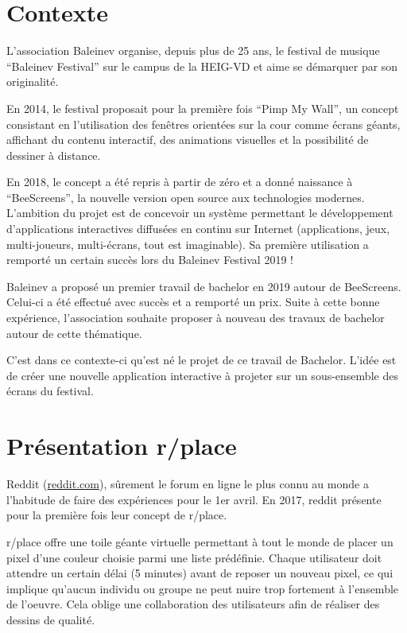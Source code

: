 \section{Contexte}
L'association Baleinev organise, depuis plus de 25 ans, le festival de musique “Baleinev Festival” sur le campus de la HEIG-VD et aime se démarquer par son originalité.

En 2014, le festival proposait pour la première fois “Pimp My Wall”, un concept consistant en l'utilisation des fenêtres orientées sur la cour comme écrans géants, affichant du contenu interactif, des animations visuelles et la possibilité de dessiner à distance.

En 2018, le concept a été repris à partir de zéro et a donné naissance à “BeeScreens”, la nouvelle version open source aux technologies modernes. L'ambition du projet est de concevoir un système permettant le développement d'applications interactives diffusées en continu sur Internet (applications, jeux, multi-joueurs, multi-écrans, tout est imaginable). Sa première utilisation a remporté un certain succès lors du Baleinev Festival 2019 !

Baleinev a proposé un premier travail de bachelor en 2019 autour de BeeScreens. Celui-ci a été effectué avec succès et a remporté un prix. Suite à cette bonne expérience, l'association souhaite proposer à nouveau des travaux de bachelor autour de cette thématique.

C'est dans ce contexte-ci qu'est né le projet de ce travail de Bachelor. L'idée est de créer une nouvelle application interactive à projeter sur un sous-ensemble des écrans du festival.

\section{Présentation r/place}
Reddit (\href{https://www.reddit.com}{reddit.com}), sûrement le forum en ligne le plus connu au monde a l'habitude de faire des expériences pour le 1er avril. En 2017, reddit présente pour la première fois leur concept de r/place.

r/place \cite{rplace} offre une toile géante virtuelle permettant à tout le monde de placer un pixel d'une couleur choisie parmi une liste prédéfinie. Chaque utilisateur doit attendre un certain délai (5 minutes) avant de reposer un nouveau pixel, ce qui implique qu'aucun individu ou groupe ne peut nuire trop fortement à l'ensemble de l'oeuvre. Cela oblige une collaboration des utilisateurs afin de réaliser des dessins de qualité.

